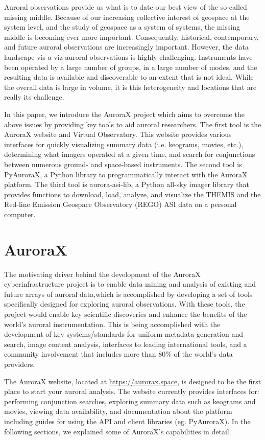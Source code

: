 \documentclass[utf8]{FrontiersinHarvard} %
\begin{document}
Auroral observations provide us what is to date our best view of the so-called missing middle. Because of our increasing collective interest of geospace at the system level, and the study of geospace as a system of systems, the missing middle is becoming ever more important. Consequently, historical, contemporary, and future auroral observations are increasingly important. However, the data landscape vis-a-viz auroral observations is highly challenging. Instruments have been operated by a large number of groups, in a large number of modes, and the resulting data is available and discoverable to an extent that is not ideal. While the overall data is large in volume, it is this heterogeneity and locations that are really its challenge.

In this paper, we introduce the AuroraX project which aims to overcome the above issues by providing key tools to aid auroral researchers. The first tool is the AuroraX website and Virtual Observatory. This website provides various interfaces for quickly visualizing summary data (i.e. keograms, movies, etc.), determining what imagers operated at a given time, and search for conjunctions between numerous ground- and space-based instruments. The second tool is PyAuroraX, a Python library to programmatically interact with the AuroraX platform. The third tool is aurora-asi-lib, a Python all-sky imager library that provides functions to download, load, analyze, and visualize the THEMIS and the Red-line Emission Geospace Observatory (REGO) ASI data on a personal computer. 

\section{AuroraX}\label{aurorax}
The motivating driver behind the development of the AuroraX cyberinfrastructure project is to enable data mining and analysis of existing and future arrays of auroral data,which is accomplished by developing a set of tools specifically designed for exploring auroral observations. With these tools, the project would enable key scientific discoveries and enhance the benefits of the world's auroral instrumentation. This is being accomplished with the development of key systems/standards for uniform metadata generation and search, image content analysis, interfaces to leading international tools, and a community involvement that includes more than 80\% of the world's data providers. 

The AuroraX website, located at \url{https://aurorax.space}, is designed to be the first place to start your auroral analysis. The website currently provides interfaces for: performing conjunction searches, exploring summary data such as keograms and movies, viewing data availability, and documentation about the platform including guides for using the API and client libraries (eg. PyAuroraX). In the following sections, we explained some of AuroraX's capabilities in detail.
\end{document}
